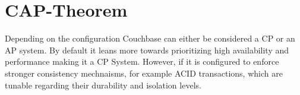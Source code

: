 \section{CAP-Theorem}
Depending on the configuration Couchbase can either be considered a CP or an AP system. By default it leans more towards prioritizing high availability and performance making it a CP System. However, if it is configured to enforce stronger consistency mechnaisms, for example ACID transactions, which are tunable regarding their durability and isolation levels. 
\cite{couchbaseCAP}